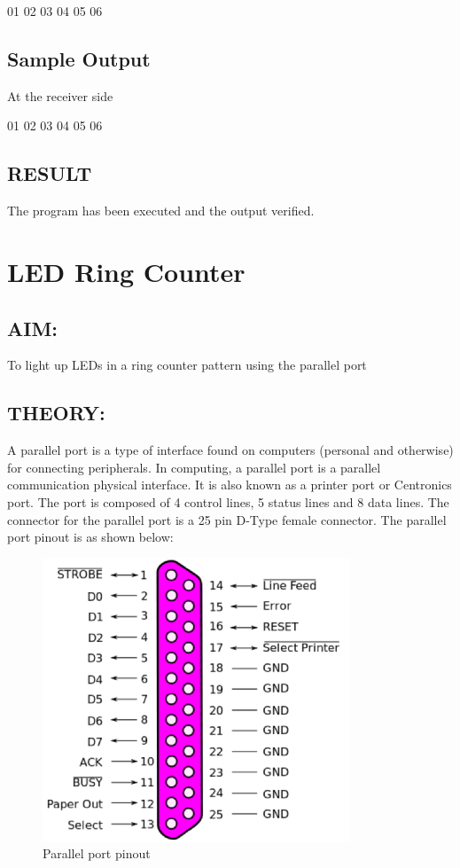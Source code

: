 \documentclass[a4paper,28pt,twoside,openright]{report}
\begin{document}
01 02 03 04 05 06

\section*{Sample Output}
At the receiver side

01 02 03 04 05 06

\section*{RESULT }
The program has been executed and the output verified.
%
\newpage
\chapter{LED Ring Counter}
%
%
%
\section*{AIM:}
To light up LEDs in a ring counter pattern using the parallel port
\section*{THEORY:}
A parallel port is a type of interface found on computers (personal and otherwise) for connecting peripherals. In computing, a parallel port is a parallel communication physical interface. It is also known as a printer port or Centronics port. The port is composed of 4 control lines, 5 status lines and 8 data lines. The connector for the parallel port is a 25 pin D-Type female connector. The parallel port pinout is as shown below:

\begin{figure}[h]
\centering
\includegraphics[scale=0.5]{parallel-port-pinout}
\caption{Parallel port pinout}
\end{figure}
\end{document}
